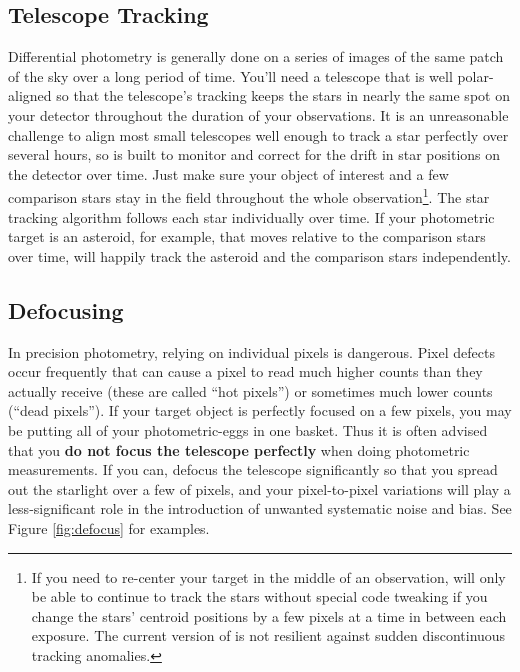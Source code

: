 \documentclass{article}
\begin{document}
\subsection{Telescope Tracking}

Differential photometry is generally done on a series of images of the same patch of the sky over a long period of time. You'll need a telescope that is well polar-aligned so that the telescope's tracking keeps the stars in nearly the same spot on your detector throughout the duration of your observations. It is an unreasonable challenge to align most small telescopes well enough to track a star perfectly over several hours, so \oscaar is built to monitor and correct for the drift in star positions on the detector over time. Just make sure your object of interest and a few comparison stars stay in the field throughout the whole observation\footnote{If you need to re-center your target in the middle of an observation, \oscaar will only be able to continue to track the stars without special code tweaking if you change the stars' centroid positions by a few pixels at a time in between each exposure. The current version of \oscaar is not resilient against sudden discontinuous tracking anomalies.}. The star tracking algorithm follows each star individually over time. If your photometric target is an asteroid, for example, that moves relative to the comparison stars over time, \oscaar will happily track the asteroid and the comparison stars independently. 

\subsection{Defocusing} \label{sec:defocusing}

In precision photometry, relying on individual pixels is dangerous. Pixel defects occur frequently that can cause a pixel to read much higher counts than they actually receive (these are called ``hot pixels'') or sometimes much lower counts (``dead pixels''). If your target object is perfectly focused on a few pixels, you may be putting all of your photometric-eggs in one basket. Thus it is often advised that you \textbf{do not focus the telescope perfectly} when doing photometric measurements. If you can, defocus the telescope significantly so that you spread out the starlight over a few of pixels, and your pixel-to-pixel variations will play a less-significant role in the introduction of unwanted systematic noise and bias. See Figure \ref{fig:defocus} for examples.
\end{document}
